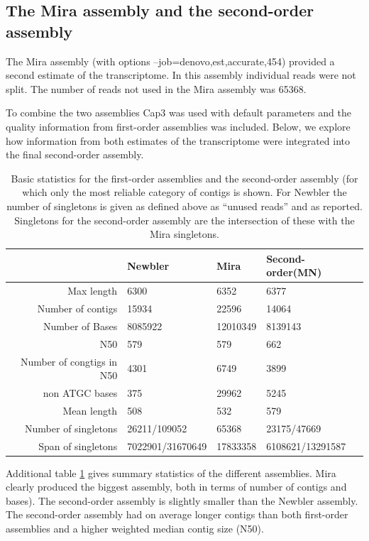 \documentclass[12pt,a4paper]{article}
\begin{document}
\subsection{The Mira assembly and the second-order assembly}
\label{sec:assembly-sec}

The Mira assembly (with options --job=denovo,est,accurate,454)
provided a second estimate of the transcriptome. In this assembly
individual reads were not split. The number of reads not used in the
Mira assembly was 65368.

To combine the two assemblies Cap3 was used with default parameters
and the quality information from first-order assemblies was
included. Below, we explore how information from both estimates of the
transcriptome were integrated into the final second-order assembly.

\begin{table}[ht]
\begin{center}
\begin{tabular}{rlll}
  \hline
 & Newbler & Mira & Second-order(MN) \\ 
  \hline
Max length & 6300 & 6352 & 6377 \\ 
  Number of contigs & 15934 & 22596 & 14064 \\ 
  Number of Bases &  8085922 & 12010349 &  8139143 \\ 
  N50 & 579 & 579 & 662 \\ 
  Number of congtigs in N50 & 4301 & 6749 & 3899 \\ 
  non ATGC bases &   375 & 29962 &  5245 \\ 
  Mean length & 508 & 532 & 579 \\ 
  Number of singletons & 26211/109052 & 65368 & 23175/47669 \\ 
  Span of singletons & 7022901/31670649 & 17833358 & 6108621/13291587 \\ 
   \hline
\end{tabular}
\caption[Basic statistics for the first-order assemblies and the second-order assembly]{Basic statistics for the first-order assemblies and the second-order assembly (for which only the most reliable category of contigs is shown. For Newbler the number of singletons is given as defined above as ``unused reads'' and as reported. Singletons for the second-order assembly are the intersection of these with the Mira singletons.}
\label{tab:pc}
\end{center}
\end{table}
Additional table \ref{tab:pc} gives summary statistics of the different
assemblies. Mira clearly produced the biggest assembly, both in terms
of number of contigs and bases). The second-order assembly is slightly
smaller than the Newbler assembly.  The second-order assembly had on
average longer contigs than both first-order assemblies and a higher
weighted median contig size (N50).
\end{document}
